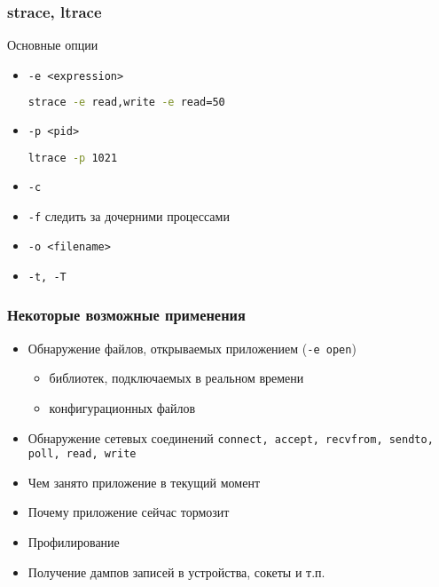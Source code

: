 


\begin{frame}[fragile]
  \frametitle{strace, ltrace}
  \begin{center}
   Основные опции 
  \end{center}
  \begin{itemize}
   \item \texttt{-e <expression>}
\begin{lstlisting}[language=sh]
  strace -e read,write -e read=50 
\end{lstlisting}
   \item \texttt{-p <pid>}
\begin{lstlisting}[language=sh]
  ltrace -p 1021
\end{lstlisting}
   \item \texttt{-c}
   \item \texttt{-f} следить за дочерними процессами
   \item \texttt{-o <filename>}
   \item \texttt{-t, -T}
  \end{itemize}
\end{frame}

\begin{frame}
 \frametitle{Некоторые возможные применения}
 \begin{itemize}
  \item Обнаружение файлов, открываемых приложением (\texttt{-e open})
    \begin{itemize}
      \item библиотек, подключаемых в реальном времени
      \item конфигурационных файлов
    \end{itemize}
   \item Обнаружение сетевых соединений \texttt{connect, accept, recvfrom, sendto, poll, read, write} 
   \item Чем занято приложение в текущий момент
   \item Почему приложение сейчас тормозит
   \item Профилирование
   \item Получение дампов записей в устройства, сокеты и т.п.
 \end{itemize}
\end{frame}


